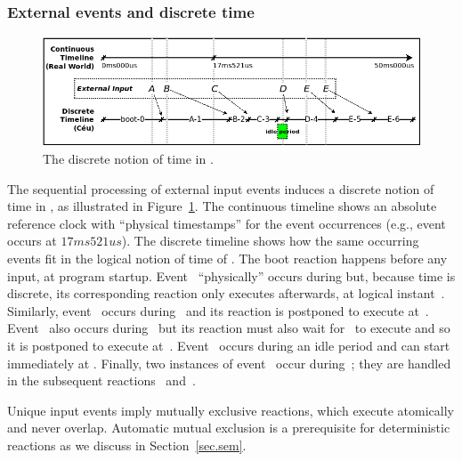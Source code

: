\subsubsection*{External events and discrete time}

\begin{figure}[b]
\centering
\includegraphics[width=\columnwidth]{tick}
\caption{The discrete notion of time in \CEU.}
\label{fig.ticks}
\end{figure}

The sequential processing of external input events induces a discrete notion of
time in \CEU, as illustrated in Figure~\ref{fig.ticks}.
%
The continuous timeline shows an absolute reference clock with ``physical
timestamps'' for the event occurrences (e.g., event~ occurs at
$17ms521us$).
%
The discrete timeline shows how the same occurring events fit in the logical
notion of time of \CEU.
%
The boot reaction  happens before any input, at program startup.
%
Event~ ``physically'' occurs during  but, because time
is discrete, its corresponding reaction only executes afterwards, at logical
instant~.
%
Similarly, event~ occurs during~ and its reaction is
postponed to execute at~.
%
Event~ also occurs during~ but its reaction must also wait
for~ to execute and so it is postponed to execute at~.
%
Event~ occurs during an idle period and can start immediately at
.
%
Finally, two instances of event~ occur during~; they are
handled in the subsequent reactions~ and~.

Unique input events imply mutually exclusive reactions, which execute
atomically and never overlap.
%
Automatic mutual exclusion is a prerequisite for deterministic reactions as
we discuss in Section~\ref{sec.sem}.
%

